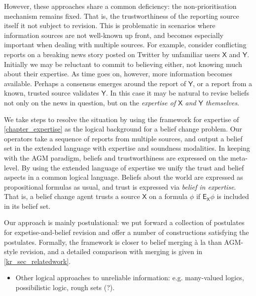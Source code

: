 {However, these approaches share a common deficiency: the non-prioritisation
mechanism remains fixed. That is, the trustworthiness of the reporting source
itself it not subject to revision. This is problematic in scenarios where
information sources are not well-known up front, and becomes especially
important when dealing with multiple sources. For example, consider conflicting
reports on a breaking news story posted on Twitter by unfamiliar users
$\mathsf{X}$ and $\mathsf{Y}$.  Initially we may be reluctant to commit to
believing either, not knowing much about their expertise. As time goes on,
however, more information becomes available. Perhaps a consensus emerges around
the report of $\mathsf{Y}$, or a report from a known, trusted source validates
$\mathsf{Y}$. In this case it may be natural to revise beliefs not only on the
news in question, but on the \emph{expertise of $\mathsf{X}$ and $\mathsf{Y}$
themselves}.

We take steps to resolve the situation by using the framework for expertise of
\cref{chapter_expertise} as the logical background for a belief change problem.
Our operators take a sequence of reports from multiple sources, and output a
belief set in the extended language with expertise and soundness modalities. In
keeping with the AGM paradigm, beliefs and trustworthiness are expressed on the
meta-level. By using the extended language of expertise we unify the trust and
belief aspects in a common logical language.\footnotemark{} Beliefs about the
world are expressed as propositional formulas as usual, and trust is expressed
via \emph{belief in expertise}. That is, a belief change agent trusts a source
$\mathsf{X}$ on a formula $\phi$ if $\mathsf{E}_{\mathsf{X}}\phi$ is included
in its belief set.


Our approach is mainly postulational: we put forward a collection of postulates
for expetise-and-belief revision and offer a number of constructions satisfying
the postulates. Formally, the framework is closer to belief merging {\`a} la
\textcite{konieczny2002merging} than AGM-style revision, and a detailed
comparison with merging is given in \cref{kr_sec_relatedwork}.

\begin{notes}
    \begin{itemize}
        \item Other logical approaches to unreliable information: e.g.
              many-valued logics, possibilistic logic, rough sets (?).
    \end{itemize}
\end{notes}

}

